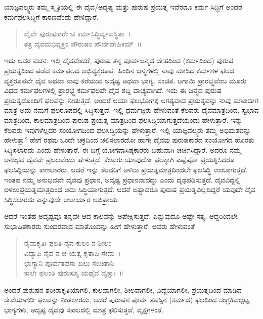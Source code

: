 {ಯಾಜ್ಞವಲ್ಕ್ಯರು ತಮ್ಮ ಸ್ಮೃತಿಯಲ್ಲಿ ಈ ದೈವ/ಅದೃಷ್ಟ ಮತ್ತು ಪುರುಷ ಪ್ರಯತ್ನ ಇವೆರಡೂ ಕರ್ಮ ಸಿದ್ಧಿಗೆ ಅಂದರೆ ಕರ್ಮಫಲಸಿದ್ಧಿಗೆ ಕಾರಣವೆಂದು ಹೇಳಿದ್ದಾರೆ.
\begin{verse}
ದೈವೇ ಪುರುಷಕಾರೇ ಚ ಕರ್ಮಸಿದ್ಧಿರ್ವ್ಯವಸ್ಥಿತಾ~।\\
ತತ್ರ ದೈವಮಭಿವ್ಯಕ್ತಂ ಪೌರುಷಂ ಪೌರ್ವದೇಹಿಕಮ್~॥
\end{verse}
ಇದು ಅವರ ವಚನ. ಇಲ್ಲಿ ದೈವವೆಂದರೆ, ಪುರುಷ ತನ್ನ ಪೂರ್ವಜನ್ಮದ ದೇಹದಿಂದ (ಕರ್ಮದಿಂದ) ಪುರುಷ ಪ್ರಯತ್ನದಿಂದ ಪಡೆದ ಕರ್ಮಫಲದ ಅಭಿವ್ಯಕ್ತರೂಪ. ಹಿಂದಿನ ಜನ್ಮಗಳಲ್ಲಿ ನಾವು ಮಾಡಿದ ಕರ್ಮಗಳ ಫಲದ ವ್ಯಕ್ತರೂಪವೇ ದೈವ ಅಥವಾ ನಾವು ಕರೆಯುವ ಅದೃಷ್ಟ ಅಥವಾ ಭಾಗ್ಯ. ಸಂಚಿತ, ಆಗಾಮಿ ಪ್ರಾರಭ್ಧವೆಂಬ ಮೂರು ವಿಧದ ಕರ್ಮಫಲಗಳಲ್ಲಿ ಪ್ರಾರಭ್ಧ ಕರ್ಮಫಲವೇ ದೈವ ಶಬ್ದ ವಾಚ್ಯವಾಗಿದೆ. ಇದು ಈ ಜನ್ಮದ ಪುರುಷ ಪ್ರಯತ್ನದೊಂದಿಗೆ ಫಲವನ್ನು ನೀಡುತ್ತದೆ. ಅಂದರೆ ಆಯಾ ಫಲಭೋಗಕ್ಕೆ ಅಗತ್ಯವಾದ ಪ್ರಯತ್ನವನ್ನು ನಾವು ಮಾಡಿದಾಗ ಮಾತ್ರ ಅದು ನಮಗೆ ಫಲರೂಪದಲ್ಲಿ ಸಿದ್ಧಿಸುತ್ತದೆ. ಇಲ್ಲಿ ಧರ್ಮಜ್ಞರು ಹೇಳುವಂತೆ ಕೆಲವರು ದೈವಮಾತ್ರದಿಂದ, ಸ್ವಭಾವ ಮಾತ್ರದಿಂದ, ಕಾಲಮಾತ್ರದಿಂದ ಪುರುಷ ಪ್ರಯತ್ನ ಮಾತ್ರದಿಂದ ಫಲಸಿದ್ಧಿಯಾಗುತ್ತದೆಯೆಂದು ಹೇಳುತ್ತಾರೆ. ಇನ್ನು ಕೆಲವರು ಇವುಗಳೆಲ್ಲದರ ಸಂಯೋಗದಿಂದ ಫಲಸಿದ್ಧಿಯನ್ನು ಹೇಳುತ್ತಾರೆ. ಇಲ್ಲಿ ಯಾಜ್ಞವಲ್ಕ್ಯರು ತಮ್ಮ ಅಭಿಮತವನ್ನು ಹೇಳುತ್ತಾ” ಹೇಗೆ ರಥವು ಒಂದೇ ಚಕ್ರದಿಂದ ಚಲಿಸಲಾರದೋ ಹಾಗೇ ದೈವವು ಪುರುಷಕಾರದ ಸಂಯೋಗದ ಹೊರತು ಸಿದ್ಧಿಸಲಾರದು ಎಂದು ಹೇಳುತ್ತಾರೆ. ಈ ಬಗ್ಗೆ ಯೋಗವಾಸಿಷ್ಠಕಾರರು ಬಹುವಾಗಿ ಚರ್ಚಿಸಿದ್ದಾರೆ. ಅದರೂ ನಮ್ಮ ಅನುಭವ ದೈವವೇ ಪ್ರಬಲವೆಂದು ಹೇಳುತ್ತದೆ. ಕೆಲವರು ಯಾವುದೋ ಫಲಕ್ಕಾಗಿ ಎಷ್ಟೆಷ್ಟೋ ಪ್ರಯತ್ನಿಸಿದರೂ ಫಲಸಿದ್ದಿಯನ್ನು ಕಾಣಲಾರರು. ಆದರೆ ಇನ್ನು ಕೆಲವರಿಗೆ ಅಳಿಲು ಪ್ರಯತ್ನಮಾತ್ರದಿಂದಲೇ ಫಲಸಿದ್ಧಿ ಉಂಟಾಗುತ್ತದೆ. ಇಂತಹ ನಮ್ಮ ಅನುಭವವೇ ದೈವವು ಪ್ರಧಾನ, ಅದೃಷ್ಟ ಪ್ರಧಾನವಾದದ್ದು ಎಂದು ದೃಢಪಡಿಸುತ್ತದೆ. ದೈವವಿದ್ದಲ್ಲಿ ಅಳಿಲುಪ್ರಯತ್ನಮಾತ್ರದಿಂದ ಅದು ಸಿದ್ಧಿಯಾಗುತ್ತದೆ. ಆದರೆ ಅಷ್ಟಾದರೂ ಪುರುಷ ಪ್ರಯತ್ನವಿಲ್ಲದಿದ್ದರೆ ಯವುದೇ ದೈವ ಸಿದ್ಧಿಸಲಾರದು ಎನ್ನುವುದೇ ಆಚಾರ್ಯರ ಅಭಿಪ್ರಾಯ. 

ಆದರೆ ಇಂತಹ ಅದೃಷ್ಟವೂ ತನ್ನದೇ ಆದ ಕಾಲವನ್ನು ಅಪೇಕ್ಷಿಸುತ್ತದೆ. ಎನ್ನುವುದೂ ಅಷ್ಟೇ ಸತ್ಯ. ಆದ್ದರಿಂದಲೇ ಸುಭಾಷಿತಕಾರರು ಸುಂದರವಾದ ಮಾತೊಂದನ್ನು ಹೀಗೆ ಹೇಳುತ್ತಾರೆ. ಅವರು ಹೇಳುವಂತೆ   \enginline{-}    \enginline{-}  
\begin{verse}
ನೈವಾಕೃತಿಃ ಫಲತಿ ನೈವ ಕುಲಂ ನ ಶೀಲಂ \\ವಿದ್ಯಾಪಿ ನೈವ ನ ಚ ಯತ್ನ ಕೃತಾಪಿ ಸೇವಾ~।\\
ಭಾಗ್ಯಾನಿ ಪೂರ್ವತಪಸಾ ಖಲು ಸಂಚಿತಾನಿ \\ಕಾಲೇ ಫಲಂತಿ ಪುರುಷಸ್ಯ ಯಥೈವ ವೃಕ್ಷಾಃ~॥
\end{verse}
ಅಂದರೆ ಪುರುಷನ ಶರೀರಾಕೃತಿಯಾಗಲಿ, ಕುಲವಾಗಲೀ, ಶೀಲವಾಗಲೀ, ವಿದ್ಯೆಯಾಗಲೀ, ಪ್ರಯತ್ನದಿಂದ ಮಾಡಿದ ಸೇವೆಯಾಗಲೀ ಫಲವನ್ನು ನೀಡಲಾರದು, ಆದರೆ ಪುರುಷನ ಪೂರ್ವ ತಪಸ್ಸಿನ (ಕರ್ಮದ) ಫಲದಿಂದ ಸಂಗ್ರಹಿಸಲ್ಪಟ್ಟ, ಭಾಗ್ಯಗಳು, ಅದೃಷ್ಟ ದೈವವು ಸಕಾಲದಲ್ಲಿ ಮಾತ್ರ ಫಲಿಸುತ್ತವೆ, ವೃಕ್ಷಗಳಂತೆ. 

}
